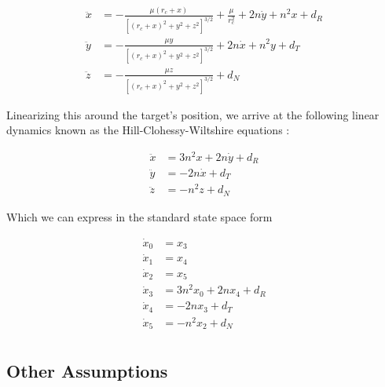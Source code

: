 \documentclass[conference]{IEEEtran}
\begin{document}
\begin{equation}
    \label{eq:circular-dynamics}
    \begin{split}
        \ddot{x} & =
            -\frac{\mu(r_c + x)}{\left[ (r_c+x)^2 + y^2 + z^2\right]^{3/2}} +
            \frac{\mu}{r_c^2} + 2n\dot{y} + n^2 x + d_R \\
        \ddot{y} & = -\frac{\mu y}{\left[ (r_c+x)^2 + y^2 + z^2\right]^{3/2}} +
            2n\dot{x} + n^2 y + d_T \\
        \ddot{z} & = -\frac{\mu z}{\left[ (r_c+x)^2 + y^2 + z^2\right]^{3/2}} +
            d_N
    \end{split}
\end{equation}

Linearizing this around the target's position, we arrive at the
following linear dynamics known as the Hill-Clohessy-Wiltshire equations \cite{cli_clohessy_nodate}:

\begin{equation}
    \label{eq:linear-dynamics}
    \begin{split}
        \ddot{x} & = 3n^2 x + 2n\dot{y}  + d_R \\
        \ddot{y} & = -2n\dot{x} + d_T \\
        \ddot{z} & = -n^2z + d_N
    \end{split}
\end{equation}

Which we can express in the standard state space form

\begin{equation}
    \label{eq:linear-dynamics-state-space}
    \begin{split}
        \dot{x}_0 &= x_3 \\
        \dot{x}_1 &= x_4 \\
        \dot{x}_2 &= x_5 \\
        \dot{x}_3 &= 3n^2x_0 + 2n x_4 + d_R\\
        \dot{x}_4 &= -2nx_3 + d_T \\
        \dot{x}_5 &= -n^2x_2 + d_N \\
    \end{split}
\end{equation}


\subsection{Other Assumptions}
\end{document}
